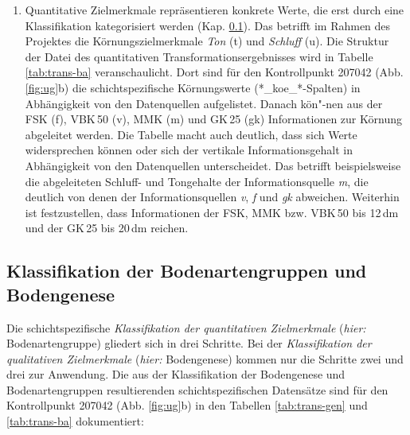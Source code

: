 \begin{enumerate}
\begin{table}
\end{table}%

\item Quantitative Zielmerkmale repräsentieren konkrete Werte, die erst durch eine Klassifikation kategorisiert werden (Kap. \ref{sec:class}). Das betrifft im Rahmen des Projektes die Körnungszielmerkmale \textit{Ton} (t) und \textit{Schluff} (u). Die Struktur der Datei des quantitativen Transformationsergebnisses  wird in Tabelle \ref{tab:trans-ba} veranschaulicht. Dort sind für den Kontrollpunkt 207042 (Abb. \ref{fig:ug}b)  die schichtspezifische Körnungswerte (*\_koe\_*-Spalten) in Abhängigkeit von den Datenquellen aufgelistet. Danach kön"-nen aus der FSK (f), VBK\,50 (v), MMK (m) und GK\,25 (gk) Informationen zur Körnung abgeleitet werden. Die Tabelle macht auch deutlich, dass sich Werte widersprechen können oder sich der vertikale Informationsgehalt in Abhängigkeit von den Datenquellen unterscheidet. Das betrifft beispielsweise die abgeleiteten Schluff- und Tongehalte der Informationsquelle \textit{m}, die deutlich von denen der Informationsquellen \textit{v}, \textit{f} und \textit{gk} abweichen. Weiterhin ist festzustellen, dass Informationen der FSK, MMK bzw. VBK\,50 bis 12\,dm und der GK\,25 bis 20\,dm reichen. 
\end{enumerate}


\subsection{Klassifikation der Bodenartengruppen und Bodengenese}\label{sec:class}
Die schichtspezifische \textit{Klassifikation der quantitativen Zielmerkmale} (\textit{hier:} Bodenartengruppe) gliedert sich in drei Schritte. Bei der \textit{Klassifikation der qualitativen Zielmerkmale} (\textit{hier:} Bodengenese) kommen nur die Schritte zwei und drei zur Anwendung. Die aus der Klassifikation der Bodengenese und Bodenartengruppen resultierenden schichtspezifischen Datensätze sind für den Kontrollpunkt 207042 (Abb. \ref{fig:ug}b) in den Tabellen \ref{tab:trans-gen} und \ref{tab:trans-ba} dokumentiert:


